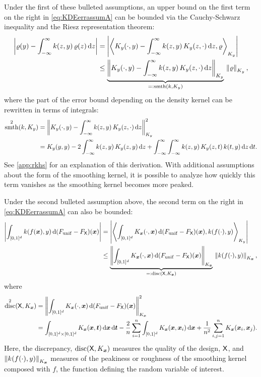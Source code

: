 \documentclass[letterpaper]{amsart}
\newcommand{\KY}{K_y}
\newcommand{\KX}{{K_{\vx}}}
\DeclareMathOperator{\smooth}{smth}
\DeclareMathOperator{\disc}{disc}
\begin{document}
Under the first of these bulleted assumptions, an upper bound on the first term on the right in \eqref{eq:KDEerrassumA} can be bounded via the Cauchy-Schwarz inequality and the Riesz representation theorem:
\begin{align}
\label{eq:firstbd}
\abs{\varrho(y) - \int_{-\infty}^{\infty} k(z,y) \, \varrho(z) \, \dif z}
& = \abs{\ip[\KY]{\KY(\cdot,y) - \int_{-\infty}^{\infty} k(z,y) \, \KY(z,\cdot) \,  \dif z}{\varrho} } \\
\nonumber
& \le  \underbrace{\norm[\KY]{\KY(\cdot,y) - \int_{-\infty}^{\infty} k(z,y) \, \KY(z,\cdot) \, \dif z}}_{=: \smooth(k,\KY)} \, \norm[\KY]{\varrho},
\end{align}
where the part of the error bound depending on the density kernel can be rewritten in terms of integrals:
\begin{align}
\label{eq:kquality}
\smooth^2(k,\KY) &= \norm[\KY]{\KY(\cdot,y) - \int_{-\infty}^{\infty} k(z,y) \, \KY(z,\cdot) \, \dif z}^2 \\
\nonumber
&=  \KY(y,y) - 2 \int_{-\infty}^{\infty} k(z,y) \, \KY(z,y) \, \dif z  + \int_{-\infty}^{\infty} \int_{-\infty}^{\infty}  k(z,y) \, \KY(z,t) \, k(t,y)\, \dif z \, \dif t.
\end{align}
See \cref{app:rkhs} for an explanation of this derivation.  With additional assumptions about the form of the smoothing kernel, it is possible to analyze how quickly this term vanishes as the smoothing kernel becomes more peaked.

Under the second bulleted assumption above, the second term on the right in \eqref{eq:KDEerrassumA} can also be bounded:
\begin{align}
	\label{eq:secondbd}
\abs{\int_{[0,1]^d} k(f(\vx),y) \,  \dif (F_{\mathrm{unif}} - F_{\mX})(\vx)}
& = \abs{\ip[\KY]{\int_{[0,1]^d} \KX(\cdot,\vx) \,  \dif (F_{\mathrm{unif}} - F_{\mX})(\vx)}{k(f(\cdot),y) }} \\
\nonumber
& \le  \underbrace{\norm[\KX]{\int_{[0,1]^d} \KX(\cdot,\vx) \,  \dif (F_{\mathrm{unif}} - F_{\mX})(\vx)}}_{=:\disc(\mX,\KX)} \, \norm[\KX]{k(f(\cdot),y) } ,
\end{align}
where
\begin{align*}
\disc^2(\mX,\KX) & = \norm[\KX]{\int_{[0,1]^d} \KX(\cdot,\vx) \,  \dif (F_{\mathrm{unif}} - F_{\mX})(\vx)}^2 \\
\nonumber
&=  \int_{[0,1]^d \times [0,1]^d} \KX(\vx,\vt) \, \dif \vx \, \dif \vt -
\frac 2n \sum_{i=1}^n \int_{[0,1]^d} \KX(\vx,\vx_i) \, \dif \vx  + \frac 1{n^2} \sum_{i,j=1}^n  \KX(\vx_i,\vx_j) .
\end{align*}
Here, the discrepancy, $\disc(\mX,\KX)$ measures the quality of the design, $\mathsf{X}$, and $\norm[\KX]{k(f(\cdot),y) }$ measures of the peakiness or roughness of the smoothing kernel composed with $f$, the function defining the random variable of interest.
\end{document}
